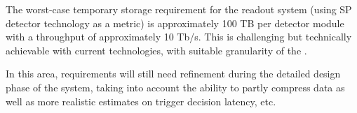 The worst-case temporary storage requirement for the readout system (using SP detector technology as a metric) is approximately 100 TB per  detector module with a throughput of approximately 10 Tb/s.
This is challenging but technically achievable with current technologies, with suitable granularity of the . 

In this area, requirements will still need refinement during the detailed design phase of the  system, taking into account the ability to partly compress data as well as more realistic estimates on trigger decision latency, etc.








